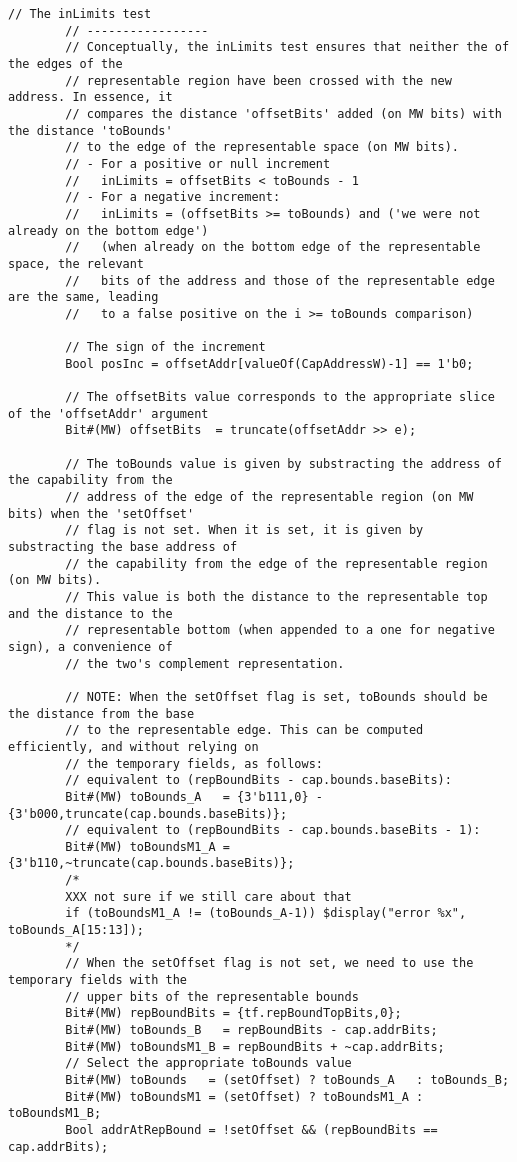 \begin{lstlisting}[language=bluespec]
        // The inLimits test
        // -----------------
        // Conceptually, the inLimits test ensures that neither the of the edges of the
        // representable region have been crossed with the new address. In essence, it
        // compares the distance 'offsetBits' added (on MW bits) with the distance 'toBounds'
        // to the edge of the representable space (on MW bits).
        // - For a positive or null increment
        //   inLimits = offsetBits < toBounds - 1
        // - For a negative increment:
        //   inLimits = (offsetBits >= toBounds) and ('we were not already on the bottom edge')
        //   (when already on the bottom edge of the representable space, the relevant
        //   bits of the address and those of the representable edge are the same, leading
        //   to a false positive on the i >= toBounds comparison)

        // The sign of the increment
        Bool posInc = offsetAddr[valueOf(CapAddressW)-1] == 1'b0;

        // The offsetBits value corresponds to the appropriate slice of the 'offsetAddr' argument
        Bit#(MW) offsetBits  = truncate(offsetAddr >> e);

        // The toBounds value is given by substracting the address of the capability from the
        // address of the edge of the representable region (on MW bits) when the 'setOffset'
        // flag is not set. When it is set, it is given by substracting the base address of
        // the capability from the edge of the representable region (on MW bits).
        // This value is both the distance to the representable top and the distance to the
        // representable bottom (when appended to a one for negative sign), a convenience of
        // the two's complement representation.

        // NOTE: When the setOffset flag is set, toBounds should be the distance from the base
        // to the representable edge. This can be computed efficiently, and without relying on
        // the temporary fields, as follows:
        // equivalent to (repBoundBits - cap.bounds.baseBits):
        Bit#(MW) toBounds_A   = {3'b111,0} - {3'b000,truncate(cap.bounds.baseBits)};
        // equivalent to (repBoundBits - cap.bounds.baseBits - 1):
        Bit#(MW) toBoundsM1_A = {3'b110,~truncate(cap.bounds.baseBits)};
        /*
        XXX not sure if we still care about that
        if (toBoundsM1_A != (toBounds_A-1)) $display("error %x", toBounds_A[15:13]);
        */
        // When the setOffset flag is not set, we need to use the temporary fields with the
        // upper bits of the representable bounds
        Bit#(MW) repBoundBits = {tf.repBoundTopBits,0};
        Bit#(MW) toBounds_B   = repBoundBits - cap.addrBits;
        Bit#(MW) toBoundsM1_B = repBoundBits + ~cap.addrBits;
        // Select the appropriate toBounds value
        Bit#(MW) toBounds   = (setOffset) ? toBounds_A   : toBounds_B;
        Bit#(MW) toBoundsM1 = (setOffset) ? toBoundsM1_A : toBoundsM1_B;
        Bool addrAtRepBound = !setOffset && (repBoundBits == cap.addrBits);


\end{lstlisting}
